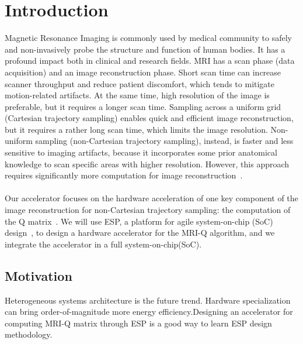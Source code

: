 \section{Introduction}
\label{sec:intro}
Magnetic Resonance Imaging is commonly used by medical community to safely and
 non-invasively probe the structure and function of human bodies. It has a 
profound impact both in clinical and research fields. 
%
MRI has a scan phase (data acquisition) and an image reconstruction phase. Short
scan time can increase scanner throughput and reduce patient discomfort, which
tends to mitigate motion-related artifacts. At the same time, high resolution of
the image is preferable, but it requires a longer scan time.
%
Sampling across a uniform grid (Cartesian trajectory sampling) enables quick and
efficient image reconstruction, but it requires a rather long scan time, which
limits the image resolution. Non-uniform sampling (non-Cartesian trajectory
sampling), instead, is faster and less sensitive to imaging artifacts, because
it incorporates some prior anatomical knowledge to scan specific areas with
higher resolution. However, this approach requires significantly more
computation for image reconstruction~\cite{stone2008accelerating}.\\
\\
Our accelerator focuses on the hardware acceleration of one key component of the image
reconstruction for non-Cartesian trajectory sampling: the computation of the Q
matrix~\cite{stratton2012parboil}. We will use ESP, a platform for
agile system-on-chip (SoC) design~\cite{esp-website, esp-release}, to design a 
hardware accelerator for the MRI-Q algorithm, and we integrate the accelerator in a 
full system-on-chip(SoC). 



\subsection{Motivation}
Heterogeneous systems architecture is the future trend. Hardware specialization
 can bring order-of-magnitude more energy efficiency.Designing an accelerator 
for computing MRI-Q matrix through ESP is a good way to learn ESP design methodology.
